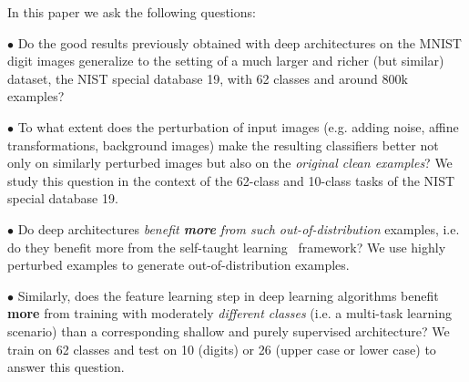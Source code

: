 \documentclass{article} %
\begin{document}

%
In this paper we ask the following questions:

$\bullet$ %
Do the good results previously obtained with deep architectures on the
MNIST digit images generalize to the setting of a much larger and richer (but similar)
dataset, the NIST special database 19, with 62 classes and around 800k examples?

$\bullet$ %
To what extent does the perturbation of input images (e.g. adding
noise, affine transformations, background images) make the resulting
classifiers better not only on similarly perturbed images but also on
the {\em original clean examples}? We study this question in the
context of the 62-class and 10-class tasks of the NIST special database 19.

$\bullet$ %
Do deep architectures {\em benefit {\bf more} from such out-of-distribution}
examples, i.e. do they benefit more from the self-taught learning~\citep{RainaR2007} framework?
We use highly perturbed examples to generate out-of-distribution examples.

$\bullet$ %
Similarly, does the feature learning step in deep learning algorithms benefit {\bf more}
from training with moderately {\em different classes} (i.e. a multi-task learning scenario) than
a corresponding shallow and purely supervised architecture?
We train on 62 classes and test on 10 (digits) or 26 (upper case or lower case)
to answer this question.
\end{document}

